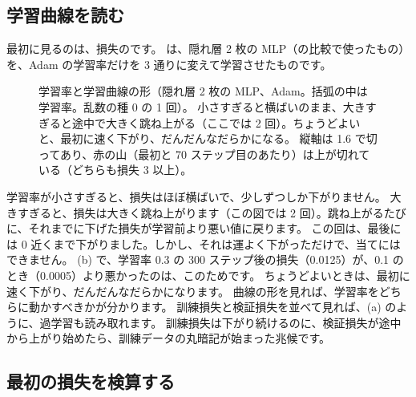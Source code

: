 \subsection*{学習曲線を読む}

最初に見るのは、損失のです。
は、隠れ層 2 枚の MLP（の比較で使ったもの）を、Adam の学習率だけを 3 通りに変えて学習させたものです。

\begin{figure}[tbp]
\centering
{}
\caption{学習率と学習曲線の形（隠れ層 2 枚の MLP、Adam。括弧の中は学習率。乱数の種 0 の 1 回）。
小さすぎると横ばいのまま、大きすぎると途中で大きく跳ね上がる（ここでは 2 回）。ちょうどよいと、最初に速く下がり、だんだんなだらかになる。
縦軸は 1.6 で切ってあり、赤の山（最初と 70 ステップ目のあたり）は上が切れている（どちらも損失 3 以上）。}
\label{fig:training-curves}
\end{figure}

学習率が小さすぎると、損失はほぼ横ばいで、少しずつしか下がりません。
大きすぎると、損失は大きく跳ね上がります（この図では 2 回）。跳ね上がるたびに、それまでに下げた損失が学習前より悪い値に戻ります。
この回は、最後には 0 近くまで下がりました。しかし、それは運よく下がっただけで、当てにはできません。
(b) で、学習率 0.3 の 300 ステップ後の損失（0.0125）が、0.1 のとき（0.0005）より悪かったのは、このためです。
ちょうどよいときは、最初に速く下がり、だんだんなだらかになります。
曲線の形を見れば、学習率をどちらに動かすべきかが分かります。
訓練損失と検証損失を並べて見れば、(a) のように、過学習も読み取れます。
訓練損失は下がり続けるのに、検証損失が途中から上がり始めたら、訓練データの丸暗記が始まった兆候です。

\subsection*{最初の損失を検算する}


